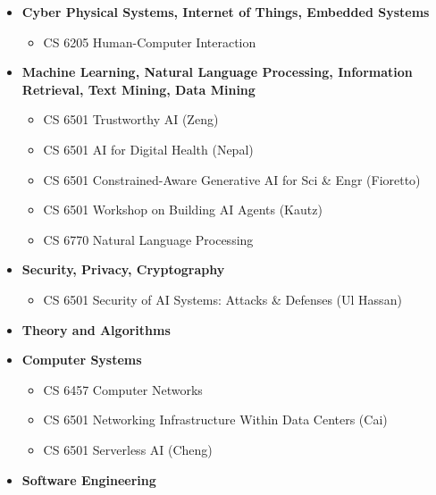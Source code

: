 \begin{itemize}[nosep]

	\item \textbf{Cyber Physical Systems, Internet of Things, Embedded Systems}
	\begin{itemize}[nosep]
		\item CS 6205 Human-Computer Interaction
	\end{itemize}

	\item \textbf{Machine Learning, Natural Language Processing, Information Retrieval, Text Mining, Data Mining}
	\begin{itemize}[nosep]
		\item CS 6501 Trustworthy AI (Zeng)
		\item CS 6501 AI for Digital Health (Nepal)
		\item CS 6501 Constrained-Aware Generative AI for Sci \& Engr (Fioretto)
		\item CS 6501 Workshop on Building AI Agents (Kautz)
		\item CS 6770 Natural Language Processing
	\end{itemize}

	\item \textbf{Security, Privacy, Cryptography}
	\begin{itemize}[nosep]
		\item CS 6501 Security of AI Systems: Attacks \& Defenses (Ul Hassan)
	\end{itemize}

	\item \textbf{Theory and Algorithms}

	\item \textbf{Computer Systems}
	\begin{itemize}[nosep]
		\item CS 6457 Computer Networks
		\item CS 6501 Networking Infrastructure Within Data Centers (Cai)
		\item CS 6501 Serverless AI (Cheng)
	\end{itemize}

	\item \textbf{Software Engineering}

\end{itemize}









